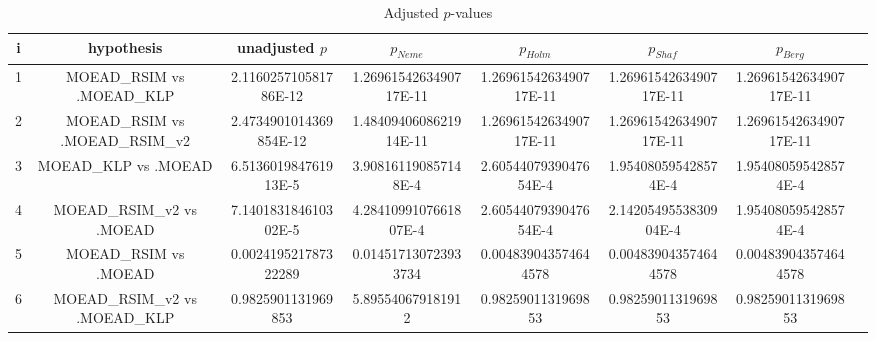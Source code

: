 \documentclass[a4paper,10pt]{article}
\begin{document}
\begin{landscape}
\begin{table}[!htp]
\centering\tiny
\caption{Adjusted $p$-values}
\begin{tabular}{cccccccc}
i&hypothesis&unadjusted $p$&$p_{Neme}$&$p_{Holm}$&$p_{Shaf}$&$p_{Berg}$\\
\hline
1&MOEAD_RSIM vs .MOEAD_KLP&2.116025710581786E-12&1.2696154263490717E-11&1.2696154263490717E-11&1.2696154263490717E-11&1.2696154263490717E-11\\
2&MOEAD_RSIM vs .MOEAD_RSIM_v2&2.4734901014369854E-12&1.4840940608621914E-11&1.2696154263490717E-11&1.2696154263490717E-11&1.2696154263490717E-11\\
3&MOEAD_KLP vs .MOEAD&6.513601984761913E-5&3.908161190857148E-4&2.6054407939047654E-4&1.954080595428574E-4&1.954080595428574E-4\\
4&MOEAD_RSIM_v2 vs .MOEAD&7.140183184610302E-5&4.2841099107661807E-4&2.6054407939047654E-4&2.1420549553830904E-4&1.954080595428574E-4\\
5&MOEAD_RSIM vs .MOEAD&0.002419521787322289&0.014517130723933734&0.004839043574644578&0.004839043574644578&0.004839043574644578\\
6&MOEAD_RSIM_v2 vs .MOEAD_KLP&0.9825901131969853&5.895540679181912&0.9825901131969853&0.9825901131969853&0.9825901131969853\\
\hline
\end{tabular}
\end{table}

\end{landscape}
\end{document}
